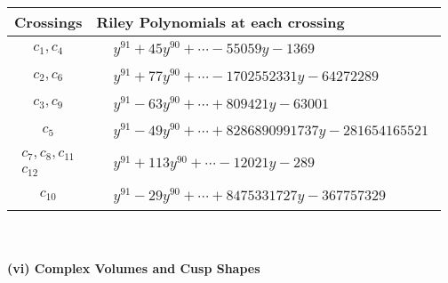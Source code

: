 \documentclass[1p]{elsarticle_modified}
\theoremstyle{definition}
\begin{document}
\begin{tabular}{m{50pt}|m{274pt}}
Crossings & \hspace{64pt}Riley Polynomials at each crossing \\
\hline $$\begin{aligned}c_{1},c_{4}\end{aligned}$$&$\begin{aligned}
&y^{91}+45 y^{90}+\cdots-55059 y-1369
\end{aligned}$\\
\hline $$\begin{aligned}c_{2},c_{6}\end{aligned}$$&$\begin{aligned}
&y^{91}+77 y^{90}+\cdots-1702552331 y-64272289
\end{aligned}$\\
\hline $$\begin{aligned}c_{3},c_{9}\end{aligned}$$&$\begin{aligned}
&y^{91}-63 y^{90}+\cdots+809421 y-63001
\end{aligned}$\\
\hline $$\begin{aligned}c_{5}\end{aligned}$$&$\begin{aligned}
&y^{91}-49 y^{90}+\cdots+8286890991737 y-281654165521
\end{aligned}$\\
\hline $$\begin{aligned}c_{7},c_{8},c_{11}\\c_{12}\end{aligned}$$&$\begin{aligned}
&y^{91}+113 y^{90}+\cdots-12021 y-289
\end{aligned}$\\
\hline $$\begin{aligned}c_{10}\end{aligned}$$&$\begin{aligned}
&y^{91}-29 y^{90}+\cdots+8475331727 y-367757329
\end{aligned}$\\
\hline
\end{tabular}\\~\\
\newpage\flushleft \textbf{(vi) Complex Volumes and Cusp Shapes}
\end{document}
